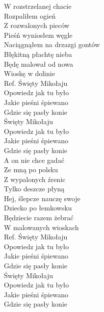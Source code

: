 
\begin{flushleft}
W rozstrzelanej chacie \tab{} \\
Rozpaliłem ogień \tab{} \\
Z rozwalonych pieców \tab{}\\
Pieśń wyniosłem węgle \tab{}\\
Naciągnąłem na drzazgi gontów \\
Błękitną płachtę nieba \tab{}\\
Będę malował od nowa \tab{}\\
Wioskę w dolinie \tab{}\\
\vskip 3mm
Ref. Święty Mikołaju  \tab{}\\
\hspace{0.9cm}Opowiedz jak tu było \tab{}\\
\hspace{0.9cm}Jakie pieśni śpiewano \tab{}\\
\hspace{0.9cm}Gdzie się pasły konie \tab{}\\
\hspace{0.9cm}Święty Mikołaju \tab{}\\
\hspace{0.9cm}Opowiedz jak tu było \tab{}\\
\hspace{0.9cm}Jakie pieśni śpiewano \tab{} \\
\hspace{0.9cm}Gdzie się pasły konie \tab{}\\
\vskip 3mm
A on nie chce gadać \\
Ze mną po polsku \\
Z wypalonych źrenic \\
Tylko deszcze płyną \\
Hej, ślepcze nauczę swoje \\
Dziecko po łemkowsku \\
Będziecie razem żebrać \\
W malowanych wioskach \\
\vskip 3mm
Ref. Święty Mikołaju \\
\hspace{0.9cm}Opowiedz jak tu było \\
\hspace{0.9cm}Jakie pieśni śpiewano \\
\hspace{0.9cm}Gdzie się pasły konie \\
\hspace{0.9cm}Święty Mikołaju \\
\hspace{0.9cm}Opowiedz jak tu było \\
\hspace{0.9cm}Jakie pieśni śpiewano \\
\hspace{0.9cm}Gdzie się pasły konie \\
\vskip 3mm

\end{flushleft}

\clearpage